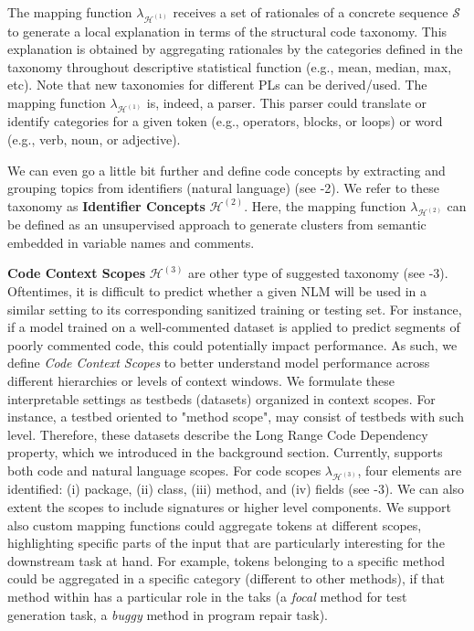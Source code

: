 The mapping function $\lambda_{\mathcal{H}^{(1)}}$ receives a set of rationales of a concrete sequence $\mathcal{S}$ to generate a local explanation in terms of the structural code taxonomy. This explanation is obtained by aggregating rationales by the categories defined in the taxonomy throughout descriptive statistical function (e.g., mean, median, max, etc). Note that new taxonomies for different PLs can be derived/used. The mapping function $\lambda_{\mathcal{H}^{(1)}}$ is, indeed, a parser. This parser could translate or identify categories for a given token (e.g., operators, blocks, or loops) or word (e.g., verb, noun, or adjective). 

We can even go a little bit further and define code concepts by extracting and grouping topics from identifiers (natural language) (see -2). We refer to these taxonomy as \textbf{Identifier Concepts} $\mathcal{H}^{(2)}$. Here, the mapping function $\lambda_{\mathcal{H}^{(2)}}$ can be defined as an unsupervised approach to generate clusters from semantic embedded in variable names and comments. 



\textbf{Code Context Scopes} $\mathcal{H}^{(3)}$ are other type of suggested taxonomy (see -3). Oftentimes, it is difficult to predict whether a given NLM will be used in a similar setting to its corresponding sanitized training or testing set. For instance, if a model trained on a well-commented dataset is applied to predict segments of poorly commented code, this could potentially impact performance. As such, we define \textit{Code Context Scopes} to better understand model performance across different hierarchies or levels of context windows.  We formulate these interpretable settings as testbeds (\ie datasets) organized in context scopes. For instance, a testbed oriented to "method scope", may consist of testbeds with such level. Therefore, these datasets describe the Long Range Code Dependency property, which we introduced in the background section. Currently, \codeSeqRational supports both code and natural language scopes. For code scopes $\lambda_{\mathcal{H}^{(3)}}$, four elements are identified: (i) package, (ii) class, (iii) method, and (iv) fields (see -3). We can also extent the scopes to include signatures or higher level components. We support also custom mapping functions could aggregate tokens at different scopes, highlighting specific parts of the input that are particularly interesting for the downstream task at hand. For example, tokens belonging to a specific method could be aggregated in a specific category (different to other methods), if that method within has a particular role in the taks (\eg a \textit{focal} method for test generation task, a \textit{buggy} method in program repair task).

